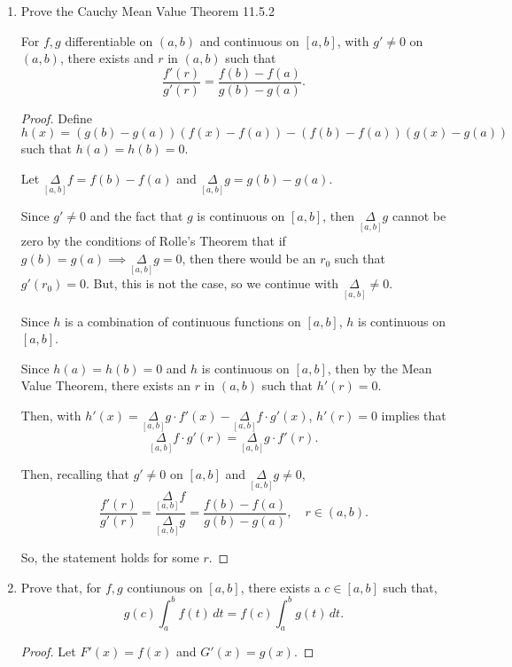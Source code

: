 \documentclass[../hw4]{subfiles}
\begin{document}
\begin{enumerate}[label= (\alph*)]
    \item Prove the Cauchy Mean Value Theorem 11.5.2
    
    \begin{theorem}
        For $f,g$ differentiable on $(a,b)$ and continuous on $[a,b]$, with $g'\neq0$ on $(a,b)$, there exists and $r$ in $(a,b)$ such that
        \[\frac{f'(r)}{g'(r)}=\frac{f(b)-f(a)}{g(b)-g(a)}.\]
    \end{theorem}

    \begin{proof}
        Define $h(x)=(g(b)-g(a))(f(x)-f(a))-(f(b)-f(a))(g(x)-g(a))$ such that $h(a)=h(b)=0$. 

        Let $\underset{[a,b]}{\Delta}f = f(b)-f(a)$ and $\underset{[a,b]}{\Delta}g=g(b)-g(a)$.

        Since $g'\neq0$ and the fact that $g$ is continuous on $[a,b]$, then $\underset{[a,b]}{\Delta}g$ cannot be zero by the conditions of Rolle's Theorem that if $g(b)=g(a)\implies \underset{[a,b]}{\Delta}g = 0$, then there would be an $r_0$ such that $g'(r_0)=0$. But, this is not the case, so we continue with $\underset{[a,b]}{\Delta}\neq0$. 

        Since $h$ is a combination of continuous functions on $[a,b]$, $h$ is continuous on $[a,b]$.

        Since $h(a)=h(b)=0$ and $h$ is continuous on $[a,b]$, then by the Mean Value Theorem, there exists an $r$ in $(a,b)$ such that $h'(r)=0$.
        
        Then, with $h'(x)=\underset{[a,b]}{\Delta}g\cdot f'(x)-\underset{[a,b]}{\Delta}f\cdot g'(x)$, $h'(r)=0$ implies that 
        \[\underset{[a,b]}{\Delta}f\cdot g'(r)=\underset{[a,b]}{\Delta}g\cdot f'(r).\]

        Then, recalling that $g'\neq0$ on $[a,b]$ and $\underset{[a,b]}{\Delta}g\neq0$,
        \[\frac{f'(r)}{g'(r)}=\frac{\underset{[a,b]}{\Delta}f}{\underset{[a,b]}{\Delta}g}=\frac{f(b)-f(a)}{g(b)-g(a)}, \quad r \in (a,b).\]

        So, the statement holds for some $r$.
    \end{proof}

    \item Prove that, for $f,g$ contiunous on $[a,b]$, there exists a $c\in[a,b]$ such that, \[g(c)\int_{a}^{b}f(t)\,dt=f(c)\int_{a}^{b}g(t)\,dt.\] 
    
    \begin{proof}
        Let $F'(x)=f(x)$ and $G'(x)=g(x)$.


\end{proof}
\end{enumerate}
\end{document}
